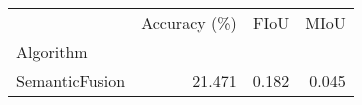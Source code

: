 \begin{tabular}{lrrr}
\toprule
{} &  Accuracy (\%) &  FIoU &  MIoU \\
Algorithm       &               &       &       \\
\midrule
SemanticFusion &        21.471 & 0.182 & 0.045 \\
\bottomrule
\end{tabular}
